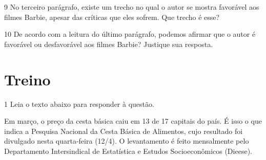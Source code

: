 {%


\num{9} No terceiro parágrafo, existe um trecho no qual o autor se mostra 
favorável aos filmes Barbie, apesar das críticas que eles sofrem. Que trecho é 
esse?


\num{10} De acordo com a leitura do último parágrafo, podemos afirmar que o autor
é favorável ou desfavorável aos filmes Barbie? Justique sua resposta. 


\section{Treino}

\num{1} Leia o texto abaixo para responder à questão.

\begin{myquote}

Em março, o preço da cesta básica caiu em 13 de 17 capitais do país. É
isso o que indica a Pesquisa Nacional da Cesta Básica de Alimentos, cujo
resultado foi divulgado nesta quarta-feira (12/4). O levantamento é
feito mensalmente pelo Departamento Intersindical de Estatística e
Estudos Socioeconômicos (Dieese).


\end{myquote}}
